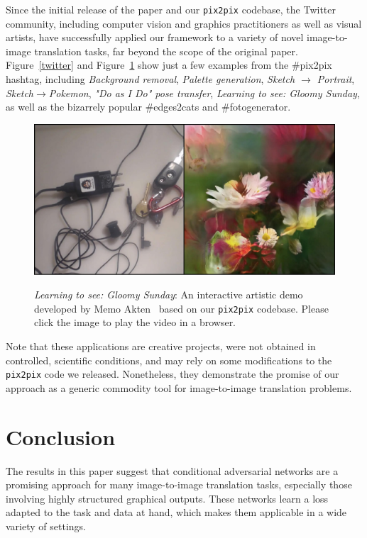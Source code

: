 \documentclass[10pt,twocolumn,letterpaper]{article}
\begin{document}
Since the initial release of the paper and our {\tt pix2pix} codebase, the Twitter community, including computer vision and graphics practitioners as well as visual artists, have successfully applied our framework to a variety of novel image-to-image translation tasks, far beyond the scope of the original paper.  Figure~\ref{twitter} and Figure~\ref{sunday}  show just a few examples from the \#pix2pix hashtag, including \emph{Background removal}, \emph{Palette generation}, \emph{Sketch $\rightarrow$ Portrait}, \emph{Sketch$\rightarrow$Pokemon}, \emph{"Do as I Do" pose transfer}, \emph{Learning to see: Gloomy Sunday}, as well as the bizarrely popular \#edges2cats and \#fotogenerator.
\begin{figure}[h]
\centering
    \href{https://vimeo.com/260612034}{\includegraphics[width=0.86\linewidth]{figs/sunday.pdf}}
    \vspace{-0.1in}
    \caption{\emph{Learning to see: Gloomy Sunday}: An interactive artistic demo developed by Memo Akten~\cite{sunday} based on our {\tt pix2pix} codebase. Please click the image to play the video in a browser.}
    \label{sunday}
    \vspace{-0.2in}
\end{figure}
Note that these applications are creative projects, were not obtained in controlled, scientific conditions, and may rely on some modifications to the {\tt pix2pix} code we released. Nonetheless, they demonstrate the promise of our approach as a generic commodity tool for image-to-image translation problems.


\vspace{-0.06in}

\section{Conclusion}
The results in this paper suggest that conditional adversarial networks are a promising approach for many image-to-image translation tasks, especially those involving highly structured graphical outputs. These networks learn a loss adapted to the task and data at hand, which makes them applicable in a wide variety of settings.
\end{document}
